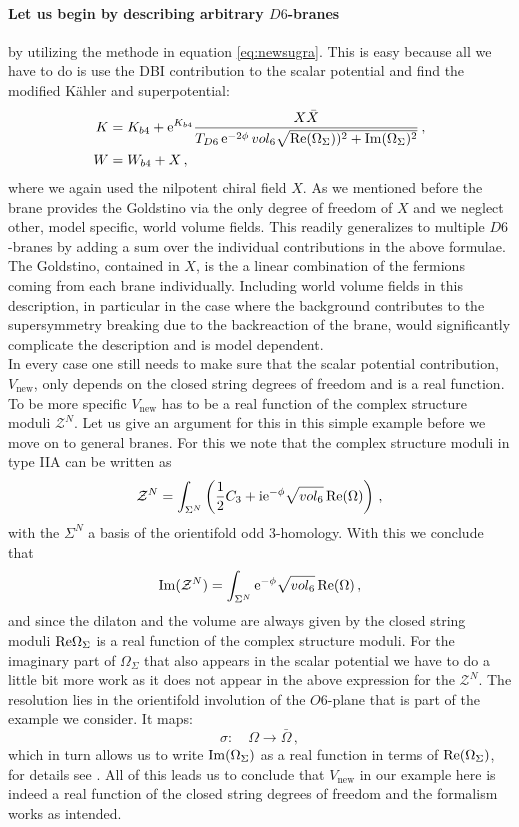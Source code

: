\documentclass[12pt]{report}
\newcommand{\be}{\begin{equation}}
\newcommand{\ee}{\end{equation}}
\newcommand{\bea}{\begin{equation}\begin{aligned}}
\newcommand{\eea}{\end{aligned}\end{equation}}
\def\rmi{{\rm i}}
\def\rme{{\rm e}}
\def\rmre{{\rm Re}}
\def\rmim{{\rm Im}}
\begin{document}
\paragraph{Let us begin by describing arbitrary $D6$-branes} by utilizing the methode in equation \eqref{eq:newsugra}. This is easy because all we have to do is use the DBI contribution to the scalar potential and find the modified Kähler and superpotential:
\bea 
K &= K_{b4} + \rme^{K_{b4}} \frac{X\bar{X}}{T_{D6} \, \rme^{-2\phi} \, vol_6 \sqrt{\rmre (\Omega_\Sigma))^2 + \rmim (\Omega_\Sigma)^2}}\,,\\
W &= W_{b4} + X\,,
\eea
where we again used the nilpotent chiral field $X$. As we mentioned before the brane provides the Goldstino via the only degree of freedom of $X$ and we neglect other, model specific, world volume fields. This readily generalizes to multiple $D6$-branes by adding a sum over the individual contributions in the above formulae. The Goldstino, contained in $X$, is the a linear combination of the fermions coming from each brane individually. Including world volume fields in this description, in particular in the case where the background contributes to the supersymmetry breaking due to the backreaction of the brane, would significantly complicate the description and is model dependent.\\
In every case one still needs to make sure that the scalar potential contribution, $V_{\text{new}}$, only depends on the closed string degrees of freedom and is a real function. To be more specific $V_{\text{new}}$ has to be a real function of the complex structure moduli $\mathcal{Z}^N$. Let us give an argument for this in this simple example before we move on to general branes. For this we note that the complex structure moduli in type IIA can be written as
\be 
\mathcal{Z}^N = \int_{\Sigma^N} \left(\frac{1}{2} C_3 + \rmi \rme^{-\phi} \sqrt{vol_6}\,\rmre(\Omega)\right)\,,
\ee
with the $\Sigma^N$ a basis of the orientifold odd 3-homology. With this we conclude that
\be 
\rmim(\mathcal{Z}^N) = \int_{\Sigma^N} \rme^{-\phi} \sqrt{vol_6} \, \rmre(\Omega)\,,
\ee
and since the dilaton and the volume are always given by the closed string moduli $\rmre{\Omega_\Sigma}$ is a real function of the complex structure moduli. For the imaginary part of $\Omega_\Sigma$ that also appears in the scalar potential we have to do a little bit more work as it does not appear in the above expression for the $\mathcal{Z}^N$. The resolution lies in the orientifold involution of the $O6$-plane that is part of the example we consider. It maps:
\be 
\sigma:\quad \Omega \to \bar{\Omega}\,,
\ee
which in turn allows us to write $\rmim(\Omega_\Sigma)$ as a real function in terms of $\rmre(\Omega_\Sigma)$, for details see \cite{Grimm:2004ua}. All of this leads us to conclude that $V_{\text{new}}$ in our example here is indeed a real function of the closed string degrees of freedom and the formalism works as intended.
\end{document}
